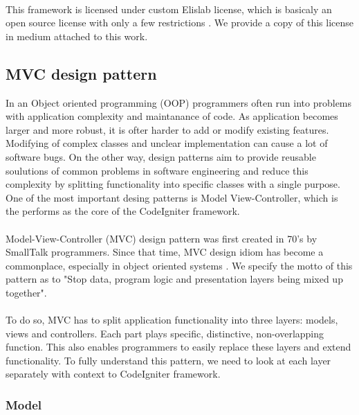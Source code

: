 \paragraph{}
This framework is licensed under custom Elislab license, which is basicaly an open source license with only a few restrictions \cite{elislablicense}. We provide a copy of this license in medium attached to this work.

\subsection{MVC design pattern}
In an Object oriented programming (OOP) programmers often run into problems with application complexity and maintanance of code. As application becomes larger and more robust, it is ofter harder to add or modify existing features. Modifying of complex classes and unclear implementation can cause a lot of software bugs. On the other way, design patterns aim to provide reusable soulutions of common problems in software engineering and reduce this complexity by splitting functionality into specific classes with a single purpose. One of the most important desing patterns is Model
View-Controller, which is the performs as the core of the CodeIgniter framework.

\paragraph{}
Model-View-Controller (MVC) design pattern was first created in 70's by SmallTalk programmers. Since that time, MVC design idiom has become a commonplace, especially in object oriented systems \cite{mvc}. We specify the motto of this pattern as to "Stop data, program logic and presentation layers being mixed up together".

\paragraph{}
To do so, MVC has to split application functionality into three layers: models, views and controllers. Each part plays specific, distinctive, non-overlapping function. This also enables programmers to easily replace these layers and extend functionality. To fully understand this pattern, we need to look at each layer separately with context to CodeIgniter framework.

\subsubsection{Model}

